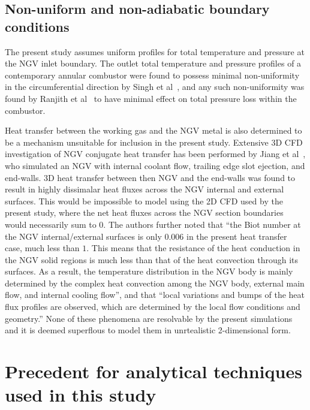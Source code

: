 \documentclass[a4paper, 11pt, oneside]{report}
\begin{document}
\subsection{Non-uniform and non-adiabatic boundary conditions}

The present study assumes uniform profiles for total temperature and pressure at the NGV inlet boundary. The outlet total temperature and pressure profiles of a contemporary annular combustor were found to possess minimal non-uniformity in the circumferential direction by Singh et al~\cite{singh_annular_combustors}, and any such non-uniformity was found by Ranjith et al~\cite{ranjith_annular_combustors} to have minimal effect on total pressure loss within the combustor. 

Heat transfer between the working gas and the NGV metal is also determined to be a mechanism unsuitable for inclusion in the present study. Extensive 3D CFD investigation of NGV conjugate heat transfer has been performed by Jiang et al~\cite{jiang_heat_transfer}, who simulated an NGV with internal coolant flow, trailing edge slot ejection, and end-walls. 3D heat transfer between then NGV and the end-walls was found to result in highly dissimalar heat fluxes across the NGV internal and external surfaces. This would be impossible to model using the 2D CFD used by the present study, where the net heat fluxes across the NGV section boundaries would necessarily sum to $0$. The authors further noted that ``the Biot number at the NGV internal/external surfaces is only $0.006$ in the present heat transfer case, much less than $1$. This means that the resistance of the heat conduction in the NGV solid regions is much less than that of the heat convection through its surfaces. As a result, the temperature distribution in the NGV body is mainly determined by the complex heat convection among the NGV body, external main flow, and internal cooling flow'', and that ``local variations and bumps of the heat flux profiles are observed, which are determined by the local flow conditions and geometry.'' None of these phenomena are resolvable by the present simulations and it is deemed superflous to model them in unrtealistic 2-dimensional form.

\section{Precedent for analytical techniques used in this study}
\label{precedent_for_analytical_techniques_used_in_this_study}
\end{document}
